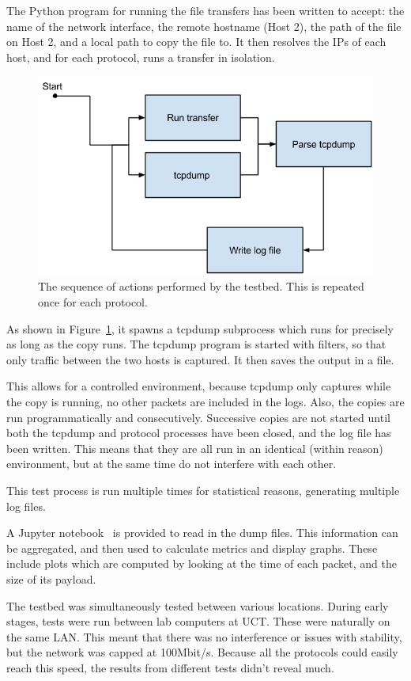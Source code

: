 \documentclass{sig-alternate-05-2015}
\begin{document}
The Python program for running the file transfers has been written to accept: the name of the network interface, the remote hostname (Host 2), the path of the file on Host 2, and a local path to copy the file to.
It then resolves the IPs of each host, and for each protocol, runs a transfer in isolation. 

\begin{figure}[t]
\centering
	\includegraphics[width=.8\linewidth]{img/loop}
\caption{The sequence of actions performed by the testbed. This is repeated once for each protocol.\label{fig:testbed_sequence}}
\end{figure}

As shown in Figure~\ref{fig:testbed_sequence}, it spawns a tcpdump subprocess which runs for precisely as long as the copy runs. The tcpdump program is started with filters, so that only traffic between the two hosts is captured. It then saves the output in a file.

This allows for a controlled environment, because tcpdump only captures while the copy is running, no other packets are included in the logs. Also, the copies are run programmatically and consecutively. Successive copies are not started until both the tcpdump and protocol processes have been closed, and the log file has been written. This means that they are all run in an identical (within reason) environment, but at the same time do not interfere with each other.

This test process is run multiple times for statistical reasons, generating multiple log files.

A Jupyter notebook~\cite{jupyter} is provided to read in the dump files. This information can be aggregated, and then used to calculate metrics and display graphs. These include plots which are computed by looking at the time of each packet, and the size of its payload.

The testbed was simultaneously tested between various locations. During early stages, tests were run between lab computers at UCT. These were naturally on the same LAN. This meant that there was no interference or issues with stability, but the network was capped at 100Mbit/s. Because all the protocols could easily reach this speed, the results from different tests didn't reveal much.
\end{document}
